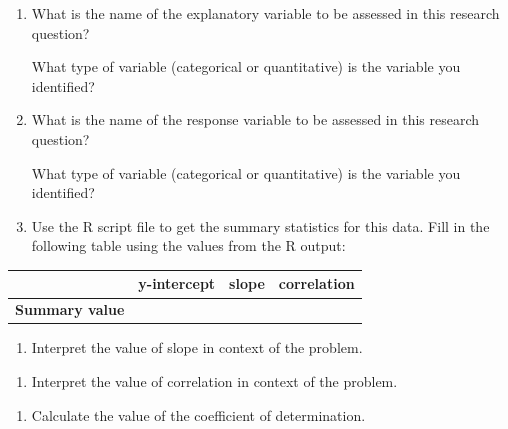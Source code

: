 \documentclass[
]{report}
\providecommand{\tightlist}{%
  \setlength{\itemsep}{0pt}\setlength{\parskip}{0pt}}
\begin{document}
\begin{enumerate}
\def\labelenumi{\alph{enumi}.}
\item
  What is the name of the explanatory variable to be assessed in this research question?
  \vspace{0.3in}

  What type of variable (categorical or quantitative) is the variable you identified?
  \vspace{0.3in}
\item
  What is the name of the response variable to be assessed in this research question?
  \vspace{0.3in}

  What type of variable (categorical or quantitative) is the variable you identified?
  \vspace{0.3in}
\item
  Use the R script file to get the summary statistics for this data. Fill in the following table using the values from the R output:
\end{enumerate}

\begingroup
\setlength{\tabcolsep}{14pt}
\renewcommand{\arraystretch}{2}
\begin{center}
\begin{tabular}{|c|p{1in}|p{1in}|p{1in}|}
\hline
 & y-intercept & slope & correlation \\ \hline
 \textbf{Summary value} & & & \\ \hline
\end{tabular}
\end{center}
\endgroup

\begin{enumerate}
\def\labelenumi{\alph{enumi}.}
\setcounter{enumi}{3}
\tightlist
\item
  Interpret the value of slope in context of the problem.
\end{enumerate}

\vspace{0.3in}

\begin{enumerate}
\def\labelenumi{\alph{enumi}.}
\setcounter{enumi}{4}
\tightlist
\item
  Interpret the value of correlation in context of the problem.
\end{enumerate}

\vspace{0.2in}

\begin{enumerate}
\def\labelenumi{\alph{enumi}.}
\setcounter{enumi}{5}
\tightlist
\item
  Calculate the value of the coefficient of determination.
\end{enumerate}
\end{document}
